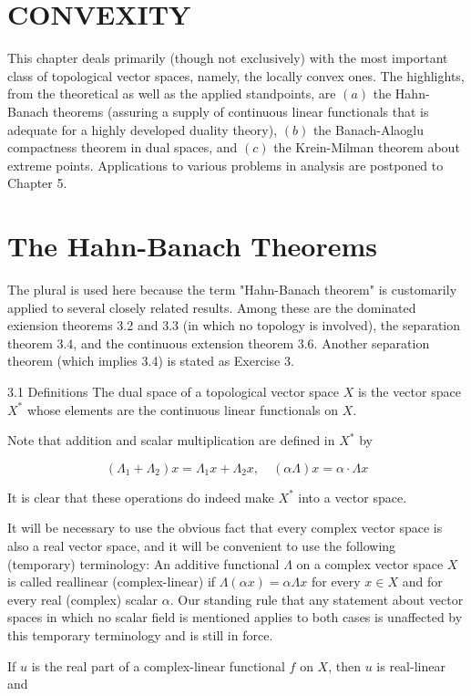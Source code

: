 \documentclass[10pt]{article}
\begin{document}
\section{CONVEXITY}
This chapter deals primarily (though not exclusively) with the most important class of topological vector spaces, namely, the locally convex ones. The highlights, from the theoretical as well as the applied standpoints, are $(a)$ the Hahn-Banach theorems (assuring a supply of continuous linear functionals that is adequate for a highly developed duality theory), $(b)$ the Banach-Alaoglu compactness theorem in dual spaces, and $(c)$ the Krein-Milman theorem about extreme points. Applications to various problems in analysis are postponed to Chapter 5.

\section{The Hahn-Banach Theorems}
The plural is used here because the term "Hahn-Banach theorem" is customarily applied to several closely related results. Among these are the dominated exiension theorems 3.2 and 3.3 (in which no topology is involved), the separation theorem 3.4, and the continuous extension theorem 3.6. Another separation theorem (which implies 3.4) is stated as Exercise 3.

3.1 Definitions The dual space of a topological vector space $X$ is the vector space $X^{*}$ whose elements are the continuous linear functionals on $X$.

Note that addition and scalar multiplication are defined in $X^{*}$ by

$$
\left(\Lambda_{1}+\Lambda_{2}\right) x=\Lambda_{1} x+\Lambda_{2} x, \quad(\alpha \Lambda) x=\alpha \cdot \Lambda x
$$

It is clear that these operations do indeed make $X^{*}$ into a vector space.

It will be necessary to use the obvious fact that every complex vector space is also a real vector space, and it will be convenient to use the following (temporary) terminology: An additive functional $\Lambda$ on a complex vector space $X$ is called reallinear (complex-linear) if $\Lambda(\alpha x)=\alpha \Lambda x$ for every $x \in X$ and for every real (complex) scalar $\alpha$. Our standing rule that any statement about vector spaces in which no scalar field is mentioned applies to both cases is unaffected by this temporary terminology and is still in force.

If $u$ is the real part of a complex-linear functional $f$ on $X$, then $u$ is real-linear and
\end{document}

